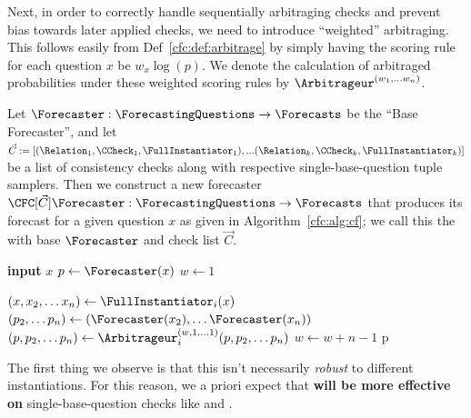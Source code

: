 Next, in order to correctly handle sequentially arbitraging checks and prevent bias towards later applied checks, we need to introduce ``weighted'' arbitraging. This follows easily from Def~\ref{cfc:def:arbitrage} by simply having the scoring rule for each question $x$ be $w_x\log(p)$. We denote the calculation of arbitraged probabilities under these weighted scoring rules by $\Arbitrageur^{(w_1,\dots w_n)}$.

\begin{definition}[\CFCaster{}]
Let $\Forecaster:\ForecastingQuestions\to\Forecasts$ be the ``Base Forecaster'', and let $\vec{C}:=[(\Relation_1,\CCheck_1,\FullInstantiator_1),...(\Relation_k,\CCheck_k,\FullInstantiator_k)]$ be a list of consistency checks along with respective single-base-question tuple samplers. Then we construct a new forecaster $\CFC[\vec{C}]{\Forecaster}:\ForecastingQuestions\to\Forecasts$ that produces its forecast for a given question $x$ as given in Algorithm~\ref{cfc:alg:cf}; we call this the \CFCaster{} with base $\Forecaster$ and check list $\vec{C}$.

\begin{algorithm}[tb]
\caption{\CFCaster{} algorithm: $\CFC[\vec{C}]{\Forecaster}$}
\label{cfc:alg:cf}
\begin{algorithmic}

\State \textbf{input} $x$
\State $p\gets\Forecaster(x)$
\State $w\gets 1$

\State $(x,x_2,\dots x_n) \gets \FullInstantiator_i(x)$
\State $(p_2,\dots p_n) \gets (\Forecaster(x_2),\dots\Forecaster(x_n))$
\State $(p,p_2,\dots p_n) \gets \Arbitrageur_i^{(w,1,\dots 1)}(p,p_2,\dots p_n)$
\State $w\gets w+n-1$
\EndFor
\State\Return p

\end{algorithmic}
\end{algorithm}

\label{cfc:def:cf}
\end{definition}

The first thing we observe is that this isn't necessarily \emph{robust} to different instantiations. For this reason, we a priori expect that \textbf{\CFCaster{} will be more effective on } single-base-question checks like \NegChecker{} and \ParaphraseChecker{}.

